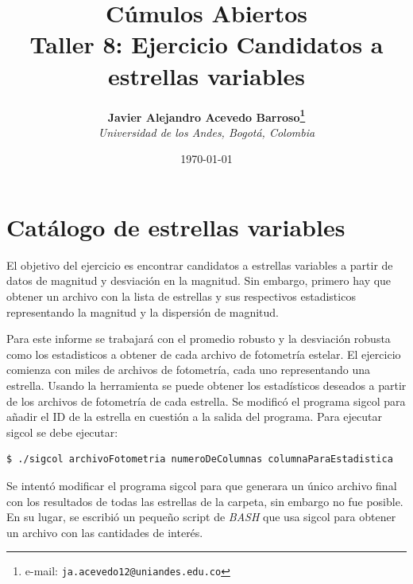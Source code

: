 \documentclass[12pt]{article}
\begin{document}
\title{Cúmulos Abiertos \\ Taller 8: Ejercicio Candidatos a estrellas variables}

\author{
\textbf{Javier Alejandro Acevedo Barroso\thanks{e-mail: \texttt{ja.acevedo12@uniandes.edu.co}}}\\
\textit{Universidad de los Andes, Bogotá, Colombia}\\
 }%

\date{\today}
\maketitle %


\normalsize
\newpage




\section{Catálogo de estrellas variables}
El objetivo del ejercicio es encontrar candidatos a estrellas variables a partir de datos de magnitud y desviación en la magnitud. Sin embargo, primero hay que obtener un archivo con la lista de estrellas y sus respectivos estadisticos representando la magnitud y la dispersión de magnitud.

Para este informe se trabajará con el promedio robusto y la desviación robusta como los estadisticos a obtener de cada archivo de fotometría estelar. El ejercicio comienza con miles de archivos de fotometría, cada uno representando una estrella. Usando la herramienta  se puede obtener los estadísticos deseados a partir de los archivos de fotometría de cada estrella. Se modificó el programa sigcol para añadir el ID de la estrella en cuestión a la salida del programa. Para ejecutar sigcol se debe ejecutar:

\begin{lstlisting}[language=bash]
 $ ./sigcol archivoFotometria numeroDeColumnas columnaParaEstadistica
\end{lstlisting}

Se intentó modificar el programa sigcol para que generara un único archivo final con los resultados de todas las estrellas de la carpeta, sin embargo no fue posible. En su lugar, se escribió un pequeño script de \emph{BASH} que usa sigcol para obtener un archivo  con las cantidades de interés.
\end{document}
